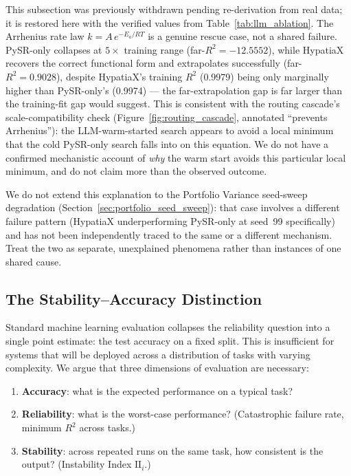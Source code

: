 \documentclass[twoside,11pt]{article}
\newcommand{\Rsq}{R^{2}}
\newcommand{\II}{\mathrm{II}}
\begin{document}
This subsection was previously withdrawn pending re-derivation from real
data; it is restored here with the verified values from
Table~\ref{tab:llm_ablation}. The Arrhenius rate law $k = A\,e^{-E_a / RT}$
is a genuine rescue case, not a shared failure. PySR-only collapses at
$5\times$ training range (far-$\Rsq = -12.5552$), while HypatiaX recovers
the correct functional form and extrapolates successfully (far-$\Rsq =
0.9028$), despite HypatiaX's training $\Rsq$ (0.9979) being only marginally
higher than PySR-only's (0.9974) --- the far-extrapolation gap is far larger
than the training-fit gap would suggest. This is consistent with the
routing cascade's scale-compatibility check (Figure~\ref{fig:routing_cascade},
annotated ``prevents Arrhenius''): the LLM-warm-started search appears to
avoid a local minimum that the cold PySR-only search falls into on this
equation. We do not have a confirmed mechanistic account of \emph{why} the
warm start avoids this particular local minimum, and do not claim more than
the observed outcome.

We do not extend this explanation to the Portfolio Variance seed-sweep
degradation (Section~\ref{sec:portfolio_seed_sweep}): that case involves a
different failure pattern (HypatiaX underperforming PySR-only at seed~99
specifically) and has not been independently traced to the same or a
different mechanism. Treat the two as separate, unexplained phenomena
rather than instances of one shared cause.

\subsection{The Stability--Accuracy Distinction}\label{subsec:the-stabilityaccuracy-distinction}
\label{sec:disc_stability}

Standard machine learning evaluation collapses the reliability question into a
single point estimate: the test accuracy on a fixed split.  This is insufficient
for systems that will be deployed across a distribution of tasks with varying
complexity.  We argue that three dimensions of evaluation are necessary:
\begin{enumerate}[leftmargin=2em,label=(\roman*)]
  \item \textbf{Accuracy}: what is the expected performance on a typical task?
  \item \textbf{Reliability}: what is the worst-case performance?
    (Catastrophic failure rate, minimum $\Rsq$ across tasks.)
  \item \textbf{Stability}: across repeated runs on the same task, how consistent
    is the output?  (Instability Index $\II_i$.)
\end{enumerate}
\end{document}
